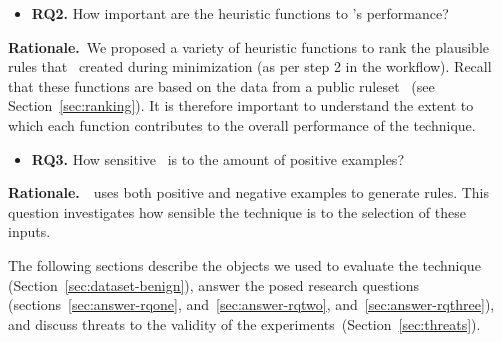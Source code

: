 \documentclass[sigconf,review, anonymous]{acmart}
\begin{document}
\newcommand{\textRQtwo}{How important are the heuristic functions
  to \tname's performance?}
\vspace{0.2cm}
\begin{itemize}[leftmargin=*,label={}]
\item{\textbf{RQ2.}} \textRQtwo\
\end{itemize}

\noindent
\textbf{Rationale.}~We proposed a variety of heuristic functions to
rank the plausible rules that \tname\ created during minimization (as
per step 2 in the workflow). Recall that these functions are based on
the data from a public ruleset~\cite{emerging-threats-open} (see
Section~\ref{sec:ranking}). It is therefore important to understand
the extent to which each function contributes to the overall
performance of the technique.

\newcommand{\textRQthree}{How sensitive \tname\ is to the amount of
  positive examples?}
\vspace{0.2cm}
\begin{itemize}[leftmargin=*,label={}]
\item{\textbf{RQ3.}} \textRQthree\
\end{itemize}

\noindent
\textbf{Rationale.}~\tname\ uses both positive and negative examples
to generate rules. This question investigates how sensible the
technique is to the selection of these inputs.
\noindent
\vspace{1ex}

The following sections describe the objects we used to evaluate the
technique (Section~\ref{sec:dataset-benign}), answer the posed
research questions (sections~\ref{sec:answer-rqone},
and~\ref{sec:answer-rqtwo}, and~\ref{sec:answer-rqthree}), and
discuss threats to the validity of the
experiments~(Section~\ref{sec:threats}).
\end{document}
